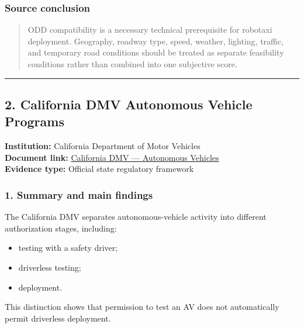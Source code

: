 \documentclass[10pt,a4paper]{article}
\providecommand{\tightlist}{\setlength{\itemsep}{0pt}\setlength{\parskip}{0pt}}
\begin{document}
\hypertarget{source-conclusion}{%
\subsubsection{Source conclusion}\label{source-conclusion}}

\begin{quote}
ODD compatibility is a necessary technical prerequisite for robotaxi deployment. Geography, roadway type, speed, weather, lighting, traffic, and temporary road conditions should be treated as separate feasibility conditions rather than combined into one subjective score.
\end{quote}

\begin{center}\rule{0.5\linewidth}{0.5pt}\end{center}

\hypertarget{california-dmv-autonomous-vehicle-programs}{%
\subsection{2. California DMV Autonomous Vehicle Programs}\label{california-dmv-autonomous-vehicle-programs}}

\textbf{Institution:} California Department of Motor Vehicles\\
\textbf{Document link:} \href{https://www.dmv.ca.gov/portal/vehicle-industry-services/autonomous-vehicles/}{California DMV --- Autonomous Vehicles}\\
\textbf{Evidence type:} Official state regulatory framework

\hypertarget{summary-and-main-findings-1}{%
\subsubsection{1. Summary and main findings}\label{summary-and-main-findings-1}}

The California DMV separates autonomous-vehicle activity into different authorization stages, including:

\begin{itemize}
\tightlist
\item
  testing with a safety driver;
\item
  driverless testing;
\item
  deployment.
\end{itemize}

This distinction shows that permission to test an AV does not automatically permit driverless deployment.
\end{document}
